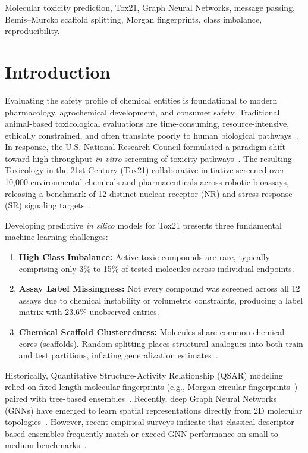 \documentclass[conference]{IEEEtran}
\begin{document}
\begin{IEEEkeywords}
Molecular toxicity prediction, Tox21, Graph Neural Networks, message passing, Bemis--Murcko scaffold splitting, Morgan fingerprints, class imbalance, reproducibility.
\end{IEEEkeywords}

\section{Introduction}
Evaluating the safety profile of chemical entities is foundational to modern pharmacology, agrochemical development, and consumer safety. Traditional animal-based toxicological evaluations are time-consuming, resource-intensive, ethically constrained, and often translate poorly to human biological pathways~\cite{hartung2009toxicology}. In response, the U.S. National Research Council formulated a paradigm shift toward high-throughput \textit{in vitro} screening of toxicity pathways~\cite{nrc2007toxicity}. The resulting Toxicology in the 21st Century (Tox21) collaborative initiative screened over 10,000 environmental chemicals and pharmaceuticals across robotic bioassays, releasing a benchmark of 12 distinct nuclear-receptor (NR) and stress-response (SR) signaling targets~\cite{huang2016tox21}.

Developing predictive \textit{in silico} models for Tox21 presents three fundamental machine learning challenges:
\begin{enumerate}
    \item \textbf{High Class Imbalance:} Active toxic compounds are rare, typically comprising only 3\% to 15\% of tested molecules across individual endpoints.
    \item \textbf{Assay Label Missingness:} Not every compound was screened across all 12 assays due to chemical instability or volumetric constraints, producing a label matrix with 23.6\% unobserved entries.
    \item \textbf{Chemical Scaffold Clusteredness:} Molecules share common chemical cores (scaffolds). Random splitting places structural analogues into both train and test partitions, inflating generalization estimates~\cite{wu2018moleculenet}.
\end{enumerate}

Historically, Quantitative Structure-Activity Relationship (QSAR) modeling relied on fixed-length molecular fingerprints (e.g., Morgan circular fingerprints~\cite{rogers2010ecfp}) paired with tree-based ensembles~\cite{svetnik2003random,svetnik2005boosting}. Recently, deep Graph Neural Networks (GNNs) have emerged to learn spatial representations directly from 2D molecular topologies~\cite{duvenaud2015convolutional,gilmer2017mpnn}. However, recent empirical surveys indicate that classical descriptor-based ensembles frequently match or exceed GNN performance on small-to-medium benchmarks~\cite{jiang2021could}.
\end{document}
